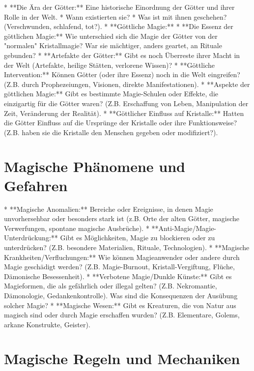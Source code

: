 \documentclass[10pt,a4paper,twocolumn,openany]{book}
\begin{document}
* **Die Ära der Götter:** Eine historische Einordnung der Götter und ihrer Rolle in der Welt.
* Wann existierten sie?
* Was ist mit ihnen geschehen? (Verschwunden, schlafend, tot?).
* **Göttliche Magie:**
* **Die Essenz der göttlichen Magie:** Wie unterschied sich die Magie der Götter von der "normalen" Kristallmagie? War sie mächtiger, anders geartet, an Rituale gebunden?
* **Artefakte der Götter:** Gibt es noch Überreste ihrer Macht in der Welt (Artefakte, heilige Stätten, verlorene Wissen)?
* **Göttliche Intervention:** Können Götter (oder ihre Essenz) noch in die Welt eingreifen? (Z.B. durch Prophezeiungen, Visionen, direkte Manifestationen).
* **Aspekte der göttlichen Magie:** Gibt es bestimmte Magie-Schulen oder Effekte, die einzigartig für die Götter waren? (Z.B. Erschaffung von Leben, Manipulation der Zeit, Veränderung der Realität).
* **Göttlicher Einfluss auf Kristalle:** Hatten die Götter Einfluss auf die Ursprünge der Kristalle oder ihre Funktionsweise? (Z.B. haben sie die Kristalle den Menschen gegeben oder modifiziert?).

\chapter{Magische Phänomene und Gefahren}

* **Magische Anomalien:** Bereiche oder Ereignisse, in denen Magie unvorhersehbar oder besonders stark ist (z.B. Orte der alten Götter, magische Verwerfungen, spontane magische Ausbrüche).
* **Anti-Magie/Magie-Unterdrückung:** Gibt es Möglichkeiten, Magie zu blockieren oder zu unterdrücken? (Z.B. besondere Materialien, Rituale, Technologien).
* **Magische Krankheiten/Verfluchungen:** Wie können Magieanwender oder andere durch Magie geschädigt werden? (Z.B. Magie-Burnout, Kristall-Vergiftung, Flüche, Dämonische Besessenheit).
* **Verbotene Magie/Dunkle Künste:** Gibt es Magieformen, die als gefährlich oder illegal gelten? (Z.B. Nekromantie, Dämonologie, Gedankenkontrolle). Was sind die Konsequenzen der Ausübung solcher Magie?
* **Magische Wesen:** Gibt es Kreaturen, die von Natur aus magisch sind oder durch Magie erschaffen wurden? (Z.B. Elementare, Golems, arkane Konstrukte, Geister).

\chapter{Magische Regeln und Mechaniken}
\end{document}
